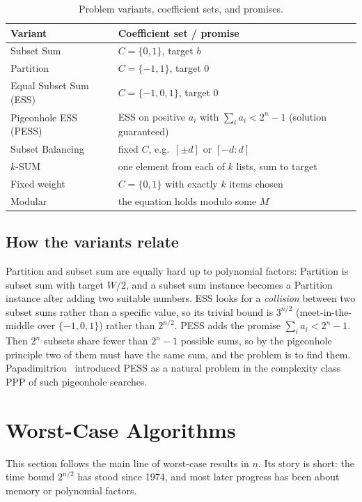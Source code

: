 \documentclass[11pt]{article}
\begin{document}
\begin{table}[t]
\centering
\caption{Problem variants, coefficient sets, and promises.}
\label{tab:variants}
\small
\begin{tabular}{p{2.9cm}p{4.4cm}}
\toprule
Variant & Coefficient set / promise \\
\midrule
Subset Sum & $C=\{0,1\}$, target $b$ \\
Partition & $C=\{-1,1\}$, target $0$ \\
Equal Subset Sum (ESS) & $C=\{-1,0,1\}$, target $0$ \\
Pigeonhole ESS (PESS) & ESS on positive $a_i$ with $\sum_ia_i<2^n-1$ (solution guaranteed) \\
Subset Balancing & fixed $C$, e.g.\ $[\pm d]$ or $[-d:d]$ \\
$k$-SUM & one element from each of $k$ lists, sum to target \\
Fixed weight & $C=\{0,1\}$ with exactly $k$ items chosen \\
Modular & the equation holds modulo some $M$ \\
\bottomrule
\end{tabular}
\end{table}

\subsection{How the variants relate}
Partition and subset sum are equally hard up to polynomial factors: Partition
is subset sum with target $W/2$, and a subset sum instance becomes a Partition
instance after adding two suitable numbers. ESS looks for a \emph{collision}
between two subset sums rather than a specific value, so its trivial bound is
$3^{n/2}$ (meet-in-the-middle over $\{-1,0,1\}$) rather than $2^{n/2}$. PESS adds
the promise $\sum_ia_i<2^n-1$. Then $2^n$ subsets share fewer than $2^n-1$ possible
sums, so by the pigeonhole principle two of them must have the same sum, and
the problem is to find them. Papadimitriou~\cite{pap} introduced PESS as a
natural problem in the complexity class PPP of such pigeonhole searches.

\section{Worst-Case Algorithms}\label{sec:classical}
This section follows the main line of worst-case results in $n$. Its story is
short: the time bound $2^{n/2}$ has stood since 1974, and most later progress
has been about memory or polynomial factors.
\end{document}
